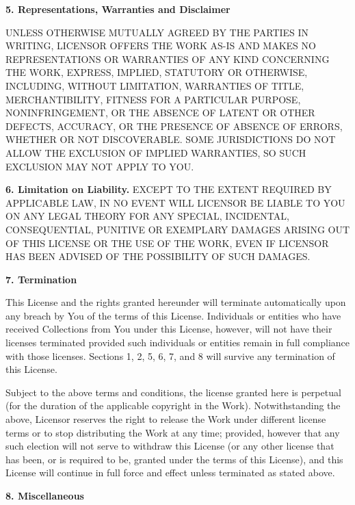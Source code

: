 \par \textbf{5. Representations, Warranties and
Disclaimer}
\par UNLESS OTHERWISE MUTUALLY AGREED BY THE PARTIES IN
WRITING, LICENSOR OFFERS THE WORK AS-IS AND MAKES NO
REPRESENTATIONS OR WARRANTIES OF ANY KIND CONCERNING THE
WORK, EXPRESS, IMPLIED, STATUTORY OR OTHERWISE, INCLUDING,
WITHOUT LIMITATION, WARRANTIES OF TITLE, MERCHANTIBILITY,
FITNESS FOR A PARTICULAR PURPOSE, NONINFRINGEMENT, OR THE
ABSENCE OF LATENT OR OTHER DEFECTS, ACCURACY, OR THE
PRESENCE OF ABSENCE OF ERRORS, WHETHER OR NOT DISCOVERABLE.
SOME JURISDICTIONS DO NOT ALLOW THE EXCLUSION OF IMPLIED
WARRANTIES, SO SUCH EXCLUSION MAY NOT APPLY TO YOU.
\par \textbf{6. Limitation on Liability.} EXCEPT TO
THE EXTENT REQUIRED BY APPLICABLE LAW, IN NO EVENT WILL
LICENSOR BE LIABLE TO YOU ON ANY LEGAL THEORY FOR ANY
SPECIAL, INCIDENTAL, CONSEQUENTIAL, PUNITIVE OR EXEMPLARY
DAMAGES ARISING OUT OF THIS LICENSE OR THE USE OF THE WORK,
EVEN IF LICENSOR HAS BEEN ADVISED OF THE POSSIBILITY OF
SUCH DAMAGES.
\par \textbf{7. Termination}
\begin{doclicense@enumerate}
\item This License and the rights granted hereunder will
terminate automatically upon any breach by You of the
terms of this License. Individuals or entities who have
received Collections from You under this License,
however, will not have their licenses terminated provided
such individuals or entities remain in full compliance
with those licenses. Sections 1, 2, 5, 6, 7, and 8 will
survive any termination of this License.
\item Subject to the above terms and conditions, the
license granted here is perpetual (for the duration of
the applicable copyright in the Work). Notwithstanding
the above, Licensor reserves the right to release the
Work under different license terms or to stop
distributing the Work at any time; provided, however that
any such election will not serve to withdraw this License
(or any other license that has been, or is required to
be, granted under the terms of this License), and this
License will continue in full force and effect unless
terminated as stated above.
\end{doclicense@enumerate}
\par \textbf{8. Miscellaneous}
